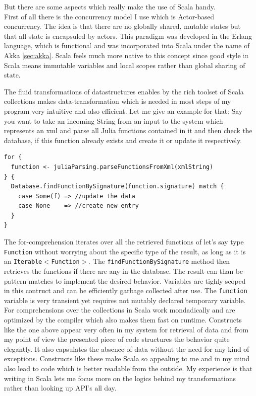 \documentclass[11p]{scrartcl}
\def\code#1{\texttt{#1}}
\begin{document}
But there are some aspects which really make the use of Scala handy.\\
First of all there is the concurrency model I use which is Actor-based concurrency. The idea is that there are no globally shared, mutable states but that all state is encapsuled by actors. This paradigm was developed in the Erlang language, which is functional and was incorporated into Scala under the name of Akka \ref{sec:akka}. Scala feels much more native to this concept since good style in Scala means immutable variables and local scopes rather than global sharing of state.

The fluid transformations of datastructures enables by the rich toolset of Scala collections makes data-transformation which is needed in most steps of my program very intuitive and also efficient. Let me give an example for that: Say you want to take an incoming String from an input to the system which represents an xml and parse all Julia functions contained in it and then check the database, if this function already exists and create it or update it respectively.

\begin{verbatim}
for {
  function <- juliaParsing.parseFunctionsFromXml(xmlString)
} {
  Database.findFunctionBySignature(function.signature) match {
    case Some(f) => //update the data
    case None    => //create new entry
  }
}
\end{verbatim}

The for-comprehension iterates over all the retrieved functions of let's say type \code{Function} without worrying about the specific type of the result, as long as it is an \code{Iterable$<$Function$>$}. The \code	{findFunctionBySignature} method then retrieves the functions if there are any in the database. The result can than be pattern matches to implement the desired behavior. Variables are tighly scoped in this contruct and can be efficiently garbage collected after use. The \code{function} variable is very transient yet requires not mutably declared temporary variable.
For comprehensions over the collections in Scala work mondadically and are optimized by the compiler which also makes them fast on runtime. Constructs like the one above appear very often in my system for retrieval of data and from my point of view the presented piece of code structures the behavior quite elegantly. It also capsulates the absence of data without the need for any kind of exceptions. Constructs like these make Scala so appealing to me and in my mind also lead to code which is better readable from the outside. My experience is that writing in Scala lets me focus more on the logics behind my transformations rather than looking up API's all day.
\end{document}
